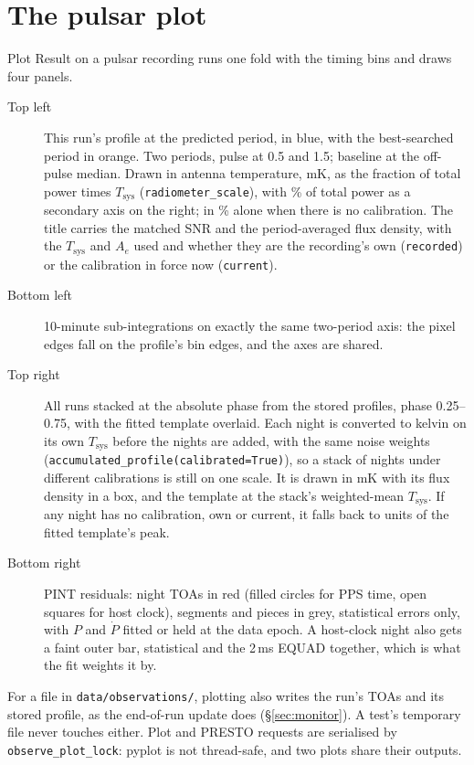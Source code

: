 \documentclass[11pt,a4paper]{article}
\newcommand{\code}[1]{\texttt{#1}}
\begin{document}
\section{The pulsar plot}
Plot Result on a pulsar recording runs one fold with the timing bins and draws four panels.
\begin{description}
\item[Top left] This run's profile at the predicted period, in blue, with the best-searched period in orange. Two periods, pulse at 0.5 and 1.5; baseline at the off-pulse median. Drawn in antenna temperature, mK, as the fraction of total power times $T_\mathrm{sys}$ (\code{radiometer\_scale}), with \% of total power as a secondary axis on the right; in \% alone when there is no calibration. The title carries the matched SNR and the period-averaged flux density, with the $T_\mathrm{sys}$ and $A_e$ used and whether they are the recording's own (\code{recorded}) or the calibration in force now (\code{current}).
\item[Bottom left] 10-minute sub-integrations on exactly the same two-period axis: the pixel edges fall on the profile's bin edges, and the axes are shared.
\item[Top right] All runs stacked at the absolute phase from the stored profiles, phase 0.25--0.75, with the fitted template overlaid. Each night is converted to kelvin on its own $T_\mathrm{sys}$ before the nights are added, with the same noise weights (\code{accumulated\_profile(calibrated=True)}), so a stack of nights under different calibrations is still on one scale. It is drawn in mK with its flux density in a box, and the template at the stack's weighted-mean $T_\mathrm{sys}$. If any night has no calibration, own or current, it falls back to units of the fitted template's peak.
\item[Bottom right] PINT residuals: night TOAs in red (filled circles for PPS time, open squares for host clock), segments and pieces in grey, statistical errors only, with $P$ and $\dot P$ fitted or held at the data epoch. A host-clock night also gets a faint outer bar, statistical and the 2\,ms EQUAD together, which is what the fit weights it by.
\end{description}

For a file in \code{data/observations/}, plotting also writes the run's TOAs and its stored profile, as the end-of-run update does (\S\ref{sec:monitor}). A test's temporary file never touches either. Plot and PRESTO requests are serialised by \code{observe\_plot\_lock}: pyplot is not thread-safe, and two plots share their outputs.
\end{document}
